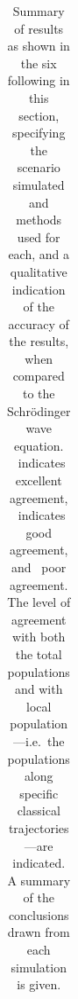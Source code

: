 {\begin{landscape}
\begin{table}
\begin{tabular}{|c|c|c|c|c||c|c|p{8cm}|}
    \\
    \hline
    \end{tabular}
    \caption{
    Summary of results as shown in the six following in this section, specifying the scenario simulated and methods used for each, and a qualitative indication of the accuracy of the results, when compared to the Schr\"odinger wave equation. \cmark\cmark\ indicates excellent agreement, \cmark\ indicates good agreement, and \xmark\ poor agreement. The level of agreement with both the total populations and with local population---i.e.~the populations along specific classical trajectories---are indicated. A summary of the conclusions drawn from each simulation is given.
    }\label{table:figure_summary}
\end{table}
\end{landscape}
\restoregeometry
}

